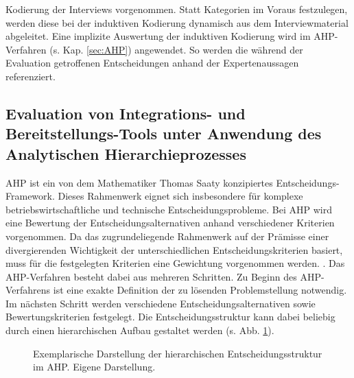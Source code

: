 Kodierung der Interviews vorgenommen. Statt Kategorien im Voraus festzulegen, werden diese bei der induktiven Kodierung dynamisch aus dem Interviewmaterial abgeleitet. Eine implizite Auswertung der induktiven Kodierung wird im AHP-Verfahren (s. Kap. \ref{sec:AHP}) angewendet. So werden die während der Evaluation getroffenen Entscheidungen anhand der Expertenaussagen referenziert.

\subsection{Evaluation von Integrations- und Bereitstellungs-Tools unter Anwendung des Analytischen Hierarchieprozesses}
\label{sec:meth_ahp}
AHP ist ein von dem Mathematiker Thomas Saaty konzipiertes Entscheidungs-Framework. Dieses Rahmenwerk eignet sich insbesondere für komplexe betriebswirtschaftliche und technische Entscheidungsprobleme. Bei AHP wird eine Bewertung der Entscheidungsalternativen anhand verschiedener Kriterien vorgenommen.  Da das zugrundeliegende Rahmenwerk auf der Prämisse einer divergierenden Wichtigkeit der unterschiedlichen Entscheidungskriterien basiert, muss für die festgelegten Kriterien eine Gewichtung vorgenommen werden. \cite[86]{Saaty.2008}. Das AHP-Verfahren besteht dabei aus mehreren Schritten. Zu Beginn des AHP-Verfahrens ist eine exakte Definition der zu lösenden Problemstellung notwendig. Im nächsten Schritt werden verschiedene Entscheidungsalternativen sowie Bewertungskriterien festgelegt. Die Entscheidungsstruktur kann dabei beliebig durch einen hierarchischen Aufbau gestaltet werden (s. Abb. \ref{fig:AHP_B}). 
\begin{center}
	\begin{figure}[H]
		\centering
		\caption[Exemplarische Darstellung der hierarchischen Entscheidungsstruktur im AHP]{Exemplarische Darstellung der hierarchischen Entscheidungsstruktur im AHP. Eigene Darstellung.}
		\label{fig:AHP_B}
	\end{figure}
\end{center}
\vspace*{-10mm}
